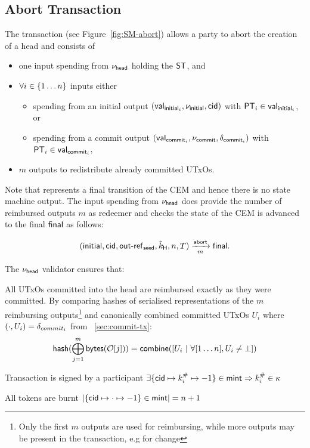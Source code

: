 \subsection{Abort Transaction}\label{sec:abort-tx}

\begin{samepage}
	The \mtxAbort{} transaction (see Figure~\ref{fig:SM-abort}) allows a
	party to abort the creation of a head and consists of
	\begin{itemize}
		\item one input spending from $\nu_\mathsf{head}$ holding the $\mathsf{ST}$, and
		\item $\forall i \in \{1 \dots n\}$ inputs either
		      \begin{itemize}
			      \item spending from an initial output $(\mathsf{val}_{\mathsf{initial}_{i}}, \nu_{\mathsf{initial}}, \mathsf{cid})$ with $\mathsf{PT}_{i} \in \mathsf{val}_{\mathsf{initial}_{i}}$, or
			      \item spending from a commit output $(\mathsf{val}_{\mathsf{commit}_{i}}, \nu_{\mathsf{commit}}, \delta_{\mathsf{commit}_{i}})$ with $\mathsf{PT}_{i} \in \mathsf{val}_{\mathsf{commit}_{i}}$,
		      \end{itemize}
		\item $m$ outputs to redistribute already committed UTxOs.
	\end{itemize}
\end{samepage}

\noindent Note that \mtxAbort{} represents a final transition of the CEM and hence there
is no state machine output. The input spending from $\nu_\mathsf{head}$ does provide the
number of reimbursed outputs $m$ as redeemer  and checks the state of the CEM is
advanced to the final $\mathsf{final}$ as follows:

\[
	(\mathsf{initial},\mathsf{cid},\mathsf{out\textsf{-}{}ref}_{\mathsf{seed}},\tilde{k}_{\mathsf{H}},n,T) \xrightarrow[m]{\mathsf{abort}} \mathsf{final}.
\]

\begin{samepage}
	\noindent The $\nu_\mathsf{head}$ validator ensures that:
	\begin{menumerate}
		\item All UTxOs committed into the head are reimbursed exactly as they were
		committed. By comparing hashes of serialised representations of the $m$
		reimbursing outputs\footnote{Only the first $m$ outputs are used for
			reimbursing, while more outputs may be present in the transaction, e.g for
			change} and canonically combined committed UTxOs $U_{i}$ where $(\cdot, U_{i}) = \delta_{commit_{i}}$ from \mtxCom{}~\ref{sec:commit-tx}:
		\[
			\mathsf{hash}(\bigoplus_{j=1}^{m} \mathsf{bytes}(\mathcal{O}[j])) = \mathsf{combine}([U_{i} ~ | ~ \forall [1\dots n], U_{i} \neq \bot])
		\]

		\item Transaction is signed by a participant $\exists \{\mathsf{cid} \mapsto k^{\#}_{i} \mapsto -1\} \in \mathsf{mint} \Rightarrow k^{\#}_{i} \in \kappa$
		\item All tokens are burnt
		$|\{\mathsf{cid} \mapsto \cdot \mapsto -1\} \in \mathsf{mint}| = n + 1$
	\end{menumerate}
\end{samepage}

